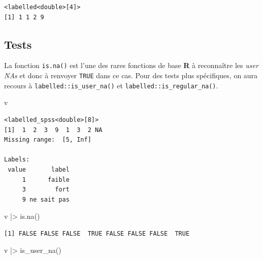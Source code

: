 \documentclass[
  letterpaper,
  DIV=11,
  numbers=noendperiod,
  oneside]{scrreprt}
\newenvironment{Shaded}{\begin{snugshade}}{\end{snugshade}}
\newcommand{\AttributeTok}[1]{\textcolor[rgb]{0.40,0.45,0.13}{#1}}
\newcommand{\ConstantTok}[1]{\textcolor[rgb]{0.56,0.35,0.01}{#1}}
\newcommand{\FunctionTok}[1]{\textcolor[rgb]{0.28,0.35,0.67}{#1}}
\newcommand{\NormalTok}[1]{\textcolor[rgb]{0.00,0.23,0.31}{#1}}
\newcommand{\OtherTok}[1]{\textcolor[rgb]{0.00,0.23,0.31}{#1}}
\newcommand{\SpecialCharTok}[1]{\textcolor[rgb]{0.37,0.37,0.37}{#1}}
\begin{document}
\begin{Shaded}
\end{Shaded}

\begin{verbatim}
<labelled<double>[4]>
[1] 1 1 2 9
\end{verbatim}

\hypertarget{tests}{%
\subsection{Tests}\label{tests}}

La fonction \texttt{is.na()} est l'une des rares fonctions de base
\textbf{R} à reconnaître les \emph{user NAs} et donc à renvoyer
\texttt{TRUE} dans ce cas. Pour des tests plus spécifiques, on aura
recours à \texttt{labelled::is\_user\_na()} et
\texttt{labelled::is\_regular\_na()}.

\begin{Shaded}
\begin{Highlighting}[]
\NormalTok{v}
\end{Highlighting}
\end{Shaded}

\begin{verbatim}
<labelled_spss<double>[8]>
[1]  1  2  3  9  1  3  2 NA
Missing range:  [5, Inf]

Labels:
 value       label
     1      faible
     3        fort
     9 ne sait pas
\end{verbatim}

\begin{Shaded}
\begin{Highlighting}[]
\NormalTok{v }\SpecialCharTok{|\textgreater{}} \FunctionTok{is.na}\NormalTok{()}
\end{Highlighting}
\end{Shaded}

\begin{verbatim}
[1] FALSE FALSE FALSE  TRUE FALSE FALSE FALSE  TRUE
\end{verbatim}

\begin{Shaded}
\begin{Highlighting}[]
\NormalTok{v }\SpecialCharTok{|\textgreater{}} \FunctionTok{is\_user\_na}\NormalTok{()}
\end{Highlighting}
\end{Shaded}
\end{document}
